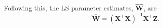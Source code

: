 \documentclass[10pt,a4paper]{article}
\begin{document}
Following this, the LS parameter estimates, $ \mathbf{\hat{W}}$, are
\begin{equation}
	\mathbf{\hat{W}}=(\mathbf X^\top\mathbf X)^{-1}\mathbf X^\top\mathbf Z. 
\end{equation}

\end{document}
